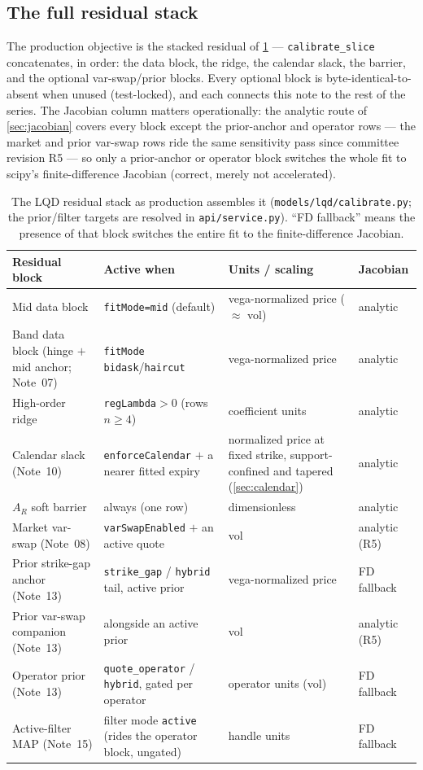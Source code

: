 \documentclass[11pt]{article}
\begin{document}
\subsection{The full residual stack}
\label{sec:hooks}

The production objective is the stacked residual of
\cref{tab:stack} --- \texttt{calibrate\_slice} concatenates, in order: the
data block, the ridge, the calendar slack, the barrier, and the optional
var-swap/prior blocks. Every optional block is byte-identical-to-absent when
unused (test-locked), and each connects this note to the rest of the series.
The Jacobian column matters operationally: the analytic route of
\cref{sec:jacobian} covers every block except the prior-anchor and operator
rows --- the market and prior var-swap rows ride the same sensitivity pass
since committee revision R5 --- so only a prior-anchor or operator block
switches the whole fit to scipy's finite-difference Jacobian (correct, merely
not accelerated).

\begin{table}[H]
\centering\small
\setlength{\tabcolsep}{4pt}
\begin{tabular}{@{}p{}p{}p{}l@{}}
\toprule
Residual block & Active when & Units / scaling & Jacobian\\
\midrule
Mid data block & \texttt{fitMode=mid} (default) & vega-normalized price
($\approx$ vol) & analytic\\
Band data block (hinge $+$ mid anchor; Note~07) & \texttt{fitMode}
\texttt{bidask}/\texttt{haircut} & vega-normalized price & analytic\\
High-order ridge & \texttt{regLambda}$>0$ (rows $n\ge4$) & coefficient units &
analytic\\
Calendar slack (Note~10) & \texttt{enforceCalendar} $+$ a nearer fitted expiry
& normalized price at fixed strike, support-confined and tapered
(\cref{sec:calendar}) & analytic\\
$A_R$ soft barrier & always (one row) & dimensionless & analytic\\
Market var-swap (Note~08) & \texttt{varSwapEnabled} $+$ an active quote &
vol & analytic (R5)\\
\midrule
Prior strike-gap anchor (Note~13) & \texttt{strike\_gap} / \texttt{hybrid}
tail, active prior & vega-normalized price & FD fallback\\
Prior var-swap companion (Note~13) & alongside an active prior & vol &
analytic (R5)\\
Operator prior (Note~13) & \texttt{quote\_operator} / \texttt{hybrid}, gated
per operator & operator units (vol) & FD fallback\\
Active-filter MAP (Note~15) & filter mode \texttt{active} (rides the operator
block, ungated) & handle units & FD fallback\\
\bottomrule
\end{tabular}
\caption{The LQD residual stack as production assembles it
(\texttt{models/lqd/calibrate.py}; the prior/filter targets are resolved in
\texttt{api/service.py}). ``FD fallback'' means the presence of that block
switches the entire fit to the finite-difference Jacobian.}
\label{tab:stack}
\end{table}
\end{document}
